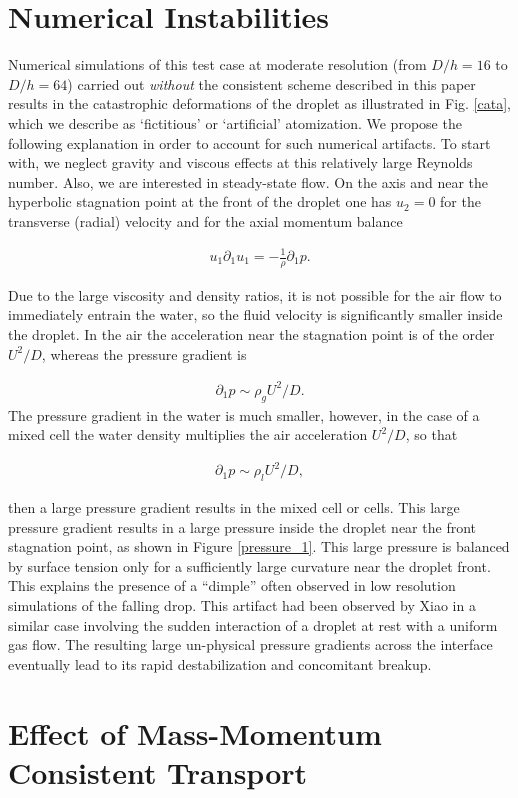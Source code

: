 \section{Numerical Instabilities}

Numerical simulations of this test case at moderate resolution 
(from $D/h=16$ to $D/h=64$) carried out \textit{without} the 
consistent scheme described in this paper results in the catastrophic 
deformations of the droplet as illustrated in Fig. \ref{cata}, 
which we describe as `fictitious' or `artificial' atomization. 
We propose the following explanation in order to account for such numerical artifacts. 
To start with, we neglect gravity and viscous effects at this relatively large Reynolds number. 
Also, we are interested in steady-state flow. 
On the axis and near the hyperbolic stagnation point 
at the front of the droplet one has $u_2=0$ for the transverse 
(radial) velocity and for the axial momentum balance


\begin{align}
u_1 \partial_1 u_1 = - \frac 1 \rho \partial_1 p.
\end{align}

Due to the large viscosity and density ratios, it is not possible for 
the air flow to immediately entrain the water, so the fluid velocity 
is significantly smaller inside the droplet. 
In the air the acceleration near the stagnation point is 
of the order $U^2/D$, whereas the pressure gradient is

\begin{align}
\partial_1 p \sim \rho_{g} U^2/D.
\end{align}
The pressure gradient in the water is much smaller, 
however, in the case of a mixed cell the water density 
multiplies the air acceleration $U^2/D$, so that

\begin{align}
\partial_1 p \sim \rho_{l} U^2/D,
\end{align}

then a large pressure gradient results in the mixed cell or cells. 
This large pressure gradient results in a large pressure inside the 
droplet near the front stagnation point, as shown in Figure \ref{pressure_1}. 
This large pressure is balanced by surface tension only for a sufficiently 
large curvature near the droplet front. 
This explains the presence of a ``dimple'' often observed in low 
resolution simulations of the falling drop. 
This artifact had been observed by Xiao \cite{xiao2012} in a similar case 
involving the sudden interaction of a droplet at rest with a uniform gas flow. 
The resulting large un-physical pressure gradients across the interface 
eventually lead to its rapid destabilization and concomitant breakup.  




\section{Effect of Mass-Momentum Consistent Transport}




